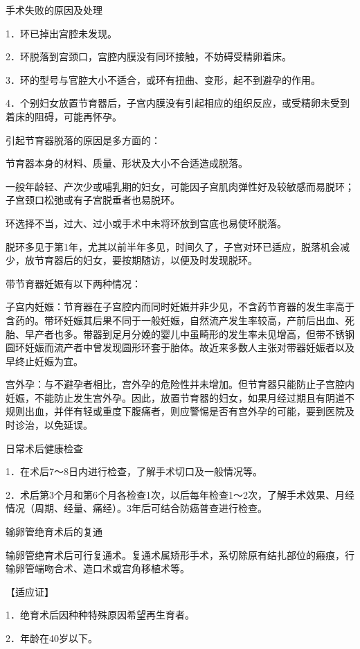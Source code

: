 \documentclass[12pt,UTF8,openany]{ctexbook}
\begin{document}
手术失败的原因及处理


1．环已掉出宫腔未发现。

2．环脱落到宫颈口，宫腔内膜没有同环接触，不妨碍受精卵着床。

3．环的型号与官腔大小不适合，或环有扭曲、变形，起不到避孕的作用。

4．个别妇女放置节育器后，子宫内膜没有引起相应的组织反应，或受精卵未受到着床的阻碍，可能再怀孕。

引起节育器脱落的原因是多方面的：

节育器本身的材料、质量、形状及大小不合适造成脱落。

一般年龄轻、产次少或哺乳期的妇女，可能因子宫肌肉弹性好及较敏感而易脱环；子宫颈口松弛或有子宫脱垂者也易脱环。

环选择不当，过大、过小或手术中未将环放到宫底也易使环脱落。

脱环多见于第1年，尤其以前半年多见，时间久了，子宫对环已适应，脱落机会减少，放节育器后的妇女，要按期随访，以便及时发现脱环。

带节育器妊娠有以下两种情况：

子宫内妊娠：节育器在子宫腔内而同时妊娠并非少见，不含药节育器的发生率高于含药的。带环妊娠其后果不同于一般妊娠，自然流产发生率较高，产前后出血、死胎、早产者也多。带器到足月分娩的婴儿中虽畸形的发生率未见增高，但带不锈钢圆环妊娠而流产者中曾发现圆形环套于胎体。故近来多数人主张对带器妊娠者以及早终止妊娠为宜。

宫外孕：与不避孕者相比，宫外孕的危险性并未增加。但节育器只能防止子宫腔内妊娠，不能防止发生宫外孕。因此，放置节育器的妇女，如果月经过期且有阴道不规则出血，并伴有轻或重度下腹痛者，则应警惕是否有宫外孕的可能，要到医院及时诊治，以免延误。





日常术后健康检查


1．在术后7～8日内进行检查，了解手术切口及一般情况等。

2．术后第3个月和第6个月各检查1次，以后每年检查1～2次，了解手术效果、月经情况（周期、经量、痛经）。3年后可结合防癌普查进行检查。





输卵管绝育术后的复通


输卵管绝育术后可行复通术。复通术属矫形手术，系切除原有结扎部位的瘢痕，行输卵管端吻合术、造口术或宫角移植术等。

【适应证】

1．绝育术后因种种特殊原因希望再生育者。

2．年龄在40岁以下。
\end{document}
